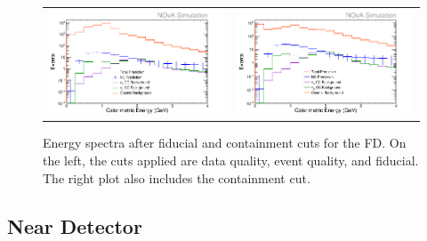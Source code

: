 \begin{figure}[htb]
  \centering
  \begin{tabular}{c c}
    \includegraphics[width=.47\textwidth]{figures/SelE/RecoE2FD.png} &
    \includegraphics[width=.47\linewidth]{figures/SelE/RecoE3FD.png} \\
  \end{tabular}
  \caption[Energy Spectra After Fiducial and Containment Cuts, FD]{Energy spectra after fiducial and containment cuts for the FD. On the left, the cuts applied are data quality, event quality, and fiducial. The right plot also includes the containment cut.}
  \label{fig:NP1FidContFD}
\end{figure}

\subsection{Near Detector}
\label{sec:SelFidContND}

